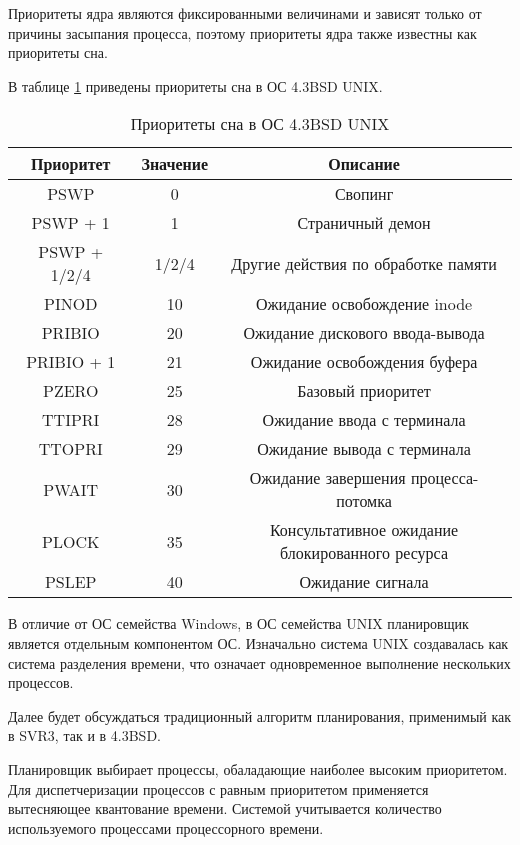 Приоритеты ядра являются фиксированными величинами и зависят только
от причины засыпания процесса, поэтому приоритеты ядра также известны как
приоритеты сна. 

В таблице \ref{tbl:sleep2} приведены приоритеты сна в ОС 4.3BSD UNIX.

\begin{table}[h!]
	\centering
	\caption{Приоритеты сна в ОС 4.3BSD UNIX}
	\begin{tabular}{|c|c|c|}
		\hline
		Приоритет & Значение & Описание \\
		\hline
		PSWP & 0 & Свопинг \\
		\hline
		PSWP + 1 & 1 & Страничный демон \\
		\hline 
		PSWP + 1/2/4 & 1/2/4 & Другие действия по обработке памяти \\
		\hline
		PINOD & 10 & Ожидание освобождение inode \\
		\hline
		PRIBIO & 20 & Ожидание дискового ввода-вывода \\ 
		\hline
		PRIBIO + 1 & 21 & Ожидание освобождения буфера \\
		\hline
		PZERO & 25 & Базовый приоритет\\
		\hline
		TTIPRI & 28 & Ожидание ввода с терминала\\
		\hline
		TTOPRI & 29 & Ожидание вывода с терминала\\
		\hline
		PWAIT & 30 & Ожидание завершения процесса-потомка\\
		\hline
		PLOCK & 35 & \makecell{Консультативное ожидание\\блокированного ресурса}\\
		\hline
		PSLEP & 40 & Ожидание сигнала\\
		\hline
	\end{tabular}
	\label{tbl:sleep2}
\end{table}

В отличие от ОС семейства Windows, в ОС семейства UNIX планировщик
является отдельным компонентом ОС. Изначально система UNIX 
создавалась как система разделения времени, что означает 
одновременное выполнение нескольких процессов.

Далее будет обсуждаться традиционный алгоритм планирования,
применимый как в SVR3, так и в 4.3BSD.

Планировщик выбирает процессы, обаладающие наиболее высоким приоритетом.
Для диспетчеризации процессов с равным приоритетом применяется 
вытесняющее квантование времени. Системой учитывается количество 
используемого процессами процессорного времени.

